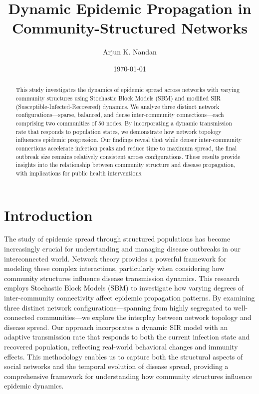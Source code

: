 \documentclass[12pt,a4paper]{article}
\title{\textbf{Dynamic Epidemic Propagation in Community-Structured Networks}}
\author{Arjun K. Nandan} %
\affil{Department of Humanities and Social Sciences, Indian Institute of Technology, Roorkee \\ 
\texttt{arjun\_kn@hs.iitr.ac.in}} %
\date{\today}
\begin{document}
\maketitle

\begin{abstract}
This study investigates the dynamics of epidemic spread across networks with varying community structures using Stochastic Block Models (SBM) and modified SIR (Susceptible-Infected-Recovered) dynamics. We analyze three distinct network configurations—sparse, balanced, and dense inter-community connections—each comprising two communities of 50 nodes. By incorporating a dynamic transmission rate that responds to population states, we demonstrate how network topology influences epidemic progression. Our findings reveal that while denser inter-community connections accelerate infection peaks and reduce time to maximum spread, the final outbreak size remains relatively consistent across configurations. These results provide insights into the relationship between community structure and disease propagation, with implications for public health interventions.
\end{abstract}


\section{Introduction}
The study of epidemic spread through structured populations has become increasingly crucial for understanding and managing disease outbreaks in our interconnected world. Network theory provides a powerful framework for modeling these complex interactions, particularly when considering how community structures influence disease transmission dynamics. This research employs Stochastic Block Models (SBM) to investigate how varying degrees of inter-community connectivity affect epidemic propagation patterns. By examining three distinct network configurations—spanning from highly segregated to well-connected communities—we explore the interplay between network topology and disease spread. Our approach incorporates a dynamic SIR model with an adaptive transmission rate that responds to both the current infection state and recovered population, reflecting real-world behavioral changes and immunity effects. This methodology enables us to capture both the structural aspects of social networks and the temporal evolution of disease spread, providing a comprehensive framework for understanding how community structures influence epidemic dynamics.
\end{document}
